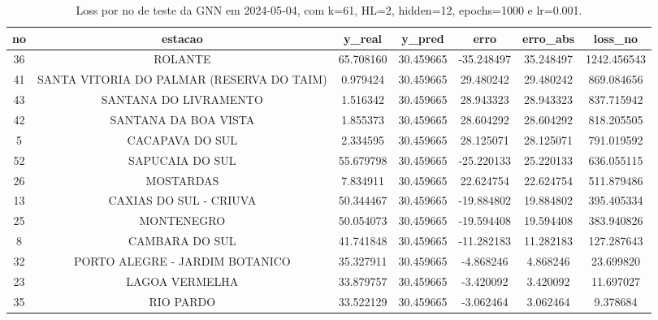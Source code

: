 \begin{table}[h]
\centering
\caption{Loss por no de teste da GNN em 2024-05-04, com k=61, HL=2, hidden=12, epochs=1000 e lr=0.001.}
\label{tab:gnn_loss_k61_hl2_h12_e1000_d20240504}
\begin{tabular}{ccccccc}
\toprule
no & estacao & y\_real & y\_pred & erro & erro\_abs & loss\_no \\
\midrule
36 & ROLANTE & 65.708160 & 30.459665 & -35.248497 & 35.248497 & 1242.456543 \\
41 & SANTA VITORIA DO PALMAR (RESERVA DO TAIM) & 0.979424 & 30.459665 & 29.480242 & 29.480242 & 869.084656 \\
43 & SANTANA DO LIVRAMENTO & 1.516342 & 30.459665 & 28.943323 & 28.943323 & 837.715942 \\
42 & SANTANA DA BOA VISTA & 1.855373 & 30.459665 & 28.604292 & 28.604292 & 818.205505 \\
5 & CACAPAVA DO SUL & 2.334595 & 30.459665 & 28.125071 & 28.125071 & 791.019592 \\
52 & SAPUCAIA DO SUL & 55.679798 & 30.459665 & -25.220133 & 25.220133 & 636.055115 \\
26 & MOSTARDAS & 7.834911 & 30.459665 & 22.624754 & 22.624754 & 511.879486 \\
13 & CAXIAS DO SUL - CRIUVA & 50.344467 & 30.459665 & -19.884802 & 19.884802 & 395.405334 \\
25 & MONTENEGRO & 50.054073 & 30.459665 & -19.594408 & 19.594408 & 383.940826 \\
8 & CAMBARA DO SUL & 41.741848 & 30.459665 & -11.282183 & 11.282183 & 127.287643 \\
32 & PORTO ALEGRE - JARDIM BOTANICO & 35.327911 & 30.459665 & -4.868246 & 4.868246 & 23.699820 \\
23 & LAGOA VERMELHA & 33.879757 & 30.459665 & -3.420092 & 3.420092 & 11.697027 \\
35 & RIO PARDO & 33.522129 & 30.459665 & -3.062464 & 3.062464 & 9.378684 \\
\bottomrule
\end{tabular}
\end{table}

